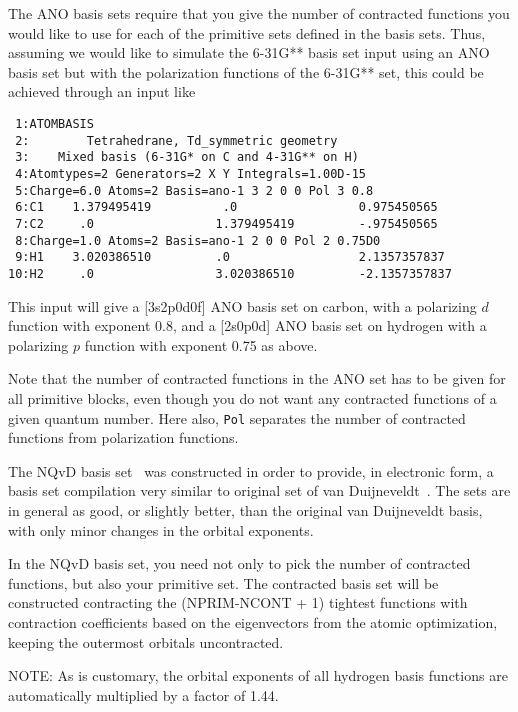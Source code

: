 The ANO basis sets require that you give the number of contracted
functions you would like to use for each of the primitive sets defined
in the basis sets. Thus, assuming we would like to simulate the
6-31G** basis set input using an ANO basis set but with the
polarization functions of the 6-31G** set, this could be achieved
through an input like

\begin{verbatim}
 1:ATOMBASIS
 2:        Tetrahedrane, Td_symmetric geometry
 3:    Mixed basis (6-31G* on C and 4-31G** on H)
 4:Atomtypes=2 Generators=2 X Y Integrals=1.00D-15
 5:Charge=6.0 Atoms=2 Basis=ano-1 3 2 0 0 Pol 3 0.8
 6:C1    1.379495419          .0                 0.975450565
 7:C2     .0                 1.379495419         -.975450565
 8:Charge=1.0 Atoms=2 Basis=ano-1 2 0 0 Pol 2 0.75D0
 9:H1    3.020386510         .0                  2.1357357837
10:H2     .0                 3.020386510         -2.1357357837
\end{verbatim}

This input will give a [3s2p0d0f] ANO basis set
on carbon, with a
polarizing $d$ function with exponent 0.8, and a [2s0p0d] ANO basis
set on hydrogen with a polarizing $p$ function with exponent 0.75 as
above.

Note that the number of contracted functions in the ANO
set has to be
given for all primitive blocks, even though you do not want any
contracted functions of a given quantum number. Here also, {\tt Pol}
separates the number of contracted functions from polarization
functions.

The NQvD basis set~\cite{nqvdref} was constructed in order to provide,
in electronic form, a basis set compilation very similar to original
set of van Duijneveldt~\cite{fbvdibmrap}.
The sets are in general as good, or slightly better, than the original
van Duijneveldt basis, with only minor changes in the orbital
exponents.

In the NQvD basis set, you need not only to pick the number of
contracted functions, but also your primitive set. The contracted
basis set will be constructed contracting the (NPRIM-NCONT + 1)
tightest functions with contraction coefficients based on the
eigenvectors from the atomic optimization, keeping the outermost
orbitals uncontracted.

NOTE: As is customary, the orbital exponents of all hydrogen basis
functions are automatically multiplied by a factor of 1.44.

